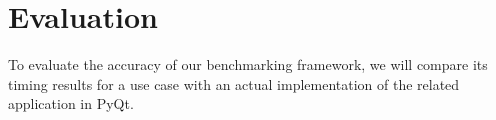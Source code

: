 
\chapter{Evaluation}
\label{ch:Evaluation}

To evaluate the accuracy of our benchmarking framework, we will compare its
timing results for a use case with an actual implementation of the related
application in PyQt.

